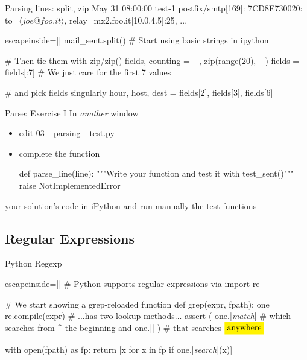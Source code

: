 \begin{pyframe}{Parsing lines: split, zip}
{\footnotesize May 31 08:00:00 test-1 postfix/smtp[169]: 7CD8E730020: to=$\langle joe@foo.it\rangle$, relay=mx2.foo.it[10.0.4.5]:25, ...  }
\begin{pycode*}{escapeinside=||}
mail_sent.split()   # Start using basic strings in ipython

# Then tie them with zip/zip() 
fields, counting  = _, zip(range(20), _)
fields = fields[:7] # We just care for the first 7 values

# and pick fields singularly
hour, host, dest = fields[2], fields[3], fields[6]

\end{pycode*}
\end{pyframe}


\begin{pyframe}{Parse: Exercise I }
In \emph{another} window
\begin{itemize}
\item edit 03\_ parsing\_ test.py
\item complete the  function
\begin{pycode}
def parse_line(line):
    """Write your function and test it
        with test_sent()"""
    raise NotImplementedError
\end{pycode}
\end{itemize}
 your solution's code in iPython and run manually
the test functions
\end{pyframe}



\subsection{Regular Expressions}

\begin{pyframe}{Python Regexp}
\begin{pycode*}{escapeinside=||}
# Python supports regular expressions via
import re

# We start showing a grep-reloaded function
def grep(expr, fpath):
    one = re.compile(expr) # ...has two lookup methods...
    assert ( one.|\emph{match}|     # which searches from ^ the beginning
         and one.|| ) # that searches $\pyver{anywhere}$

    with open(fpath) as fp:
        return [x for x in fp if one.|\emph{search}|(x)]

\end{pycode*}
\end{pyframe}

